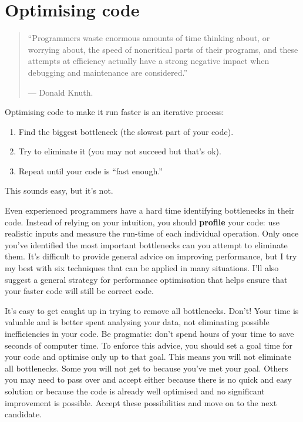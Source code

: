\chapter{Optimising code}\label{profiling}

\begin{quote}
``Programmers waste enormous amounts of time thinking about, or worrying
about, the speed of noncritical parts of their programs, and these
attempts at efficiency actually have a strong negative impact when
debugging and maintenance are considered.''

--- Donald Knuth.
\end{quote}

Optimising code to make it run faster is an iterative process:

\begin{enumerate}
\def\labelenumi{\arabic{enumi}.}
\itemsep1pt\parskip0pt
\item
  Find the biggest bottleneck (the slowest part of your code).
\item
  Try to eliminate it (you may not succeed but that's ok).
\item
  Repeat until your code is ``fast enough.''
\end{enumerate}

This sounds easy, but it's not.

Even experienced programmers have a hard time identifying bottlenecks in
their code. Instead of relying on your intuition, you should
\textbf{profile} your code: use realistic inputs and measure the
run-time of each individual operation. Only once you've identified the
most important bottlenecks can you attempt to eliminate them. It's
difficult to provide general advice on improving performance, but I try
my best with six techniques that can be applied in many situations. I'll
also suggest a general strategy for performance optimisation that helps
ensure that your faster code will still be correct code.

It's easy to get caught up in trying to remove all bottlenecks. Don't!
Your time is valuable and is better spent analysing your data, not
eliminating possible inefficiencies in your code. Be pragmatic: don't
spend hours of your time to save seconds of computer time. To enforce
this advice, you should set a goal time for your code and optimise only
up to that goal. This means you will not eliminate all bottlenecks. Some
you will not get to because you've met your goal. Others you may need to
pass over and accept either because there is no quick and easy solution
or because the code is already well optimised and no significant
improvement is possible. Accept these possibilities and move on to the
next candidate. 

